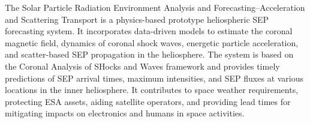 The Solar Particle Radiation Environment Analysis and Forecasting–Acceleration and Scattering Transport \citep[SPREAdFAST]{kozarev_2022} is a physics-based prototype heliospheric SEP forecasting system. It incorporates data-driven models to estimate the coronal magnetic field, dynamics of coronal shock waves, energetic particle acceleration, and scatter-based SEP propagation in the heliosphere. The system is based on the Coronal Analysis of SHocks and Waves framework \citep[CASHeW]{kozarev_2017} and provides timely predictions of SEP arrival times, maximum intensities, and SEP fluxes at various locations in the inner heliosphere. It contributes to space weather requirements, protecting ESA assets, aiding satellite operators, and providing lead times for mitigating impacts on electronics and humans in space activities.





